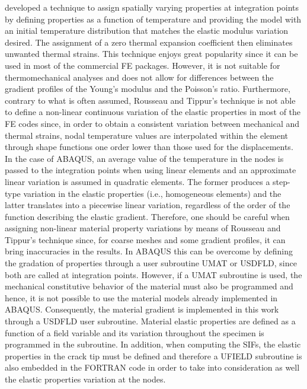 \cite{Rousseau2000} developed a technique to assign spatially varying properties at integration points by defining properties as a function of temperature and providing the model with an initial temperature distribution that matches the elastic modulus variation desired. The assignment of a zero thermal expansion coefficient then eliminates unwanted thermal strains. This technique enjoys great popularity since it can be used in most of the commercial FE packages. However, it is not suitable for thermomechanical analyses and does not allow for differences between the gradient profiles of the Young's modulus and the Poisson's ratio. Furthermore, contrary to what is often assumed, Rousseau and Tippur's technique is not able to define a non-linear continuous variation of the elastic properties in most of the FE codes since, in order to obtain a consistent variation between mechanical and thermal strains, nodal temperature values are interpolated within the element through shape functions one order lower than those used for the displacements. In the case of ABAQUS, an average value of the temperature in the nodes is passed to the integration points when using linear elements and an approximate linear variation is assumed in quadratic elements. The former produces a step-type variation in the elastic properties (i.e., homogeneous elements) and the latter translates into a piecewise linear variation, regardless of the order of the function describing the elastic gradient. Therefore, one should be careful when assigning non-linear material property variations by means of Rousseau and Tippur's technique since, for coarse meshes and some gradient profiles, it can bring inaccuracies in the results. In ABAQUS this can be overcome by defining the gradation of properties through a user subroutine UMAT or USDFLD, since both are called at integration points. However, if a UMAT subroutine is used, the mechanical constitutive behavior of the material must also be programmed and hence, it is not possible to use the material models already implemented in ABAQUS. Consequently, the material gradient is implemented in this work through a USDFLD user subroutine. Material elastic properties are defined as a function of a field variable and its variation throughout the specimen is programmed in the subroutine. In addition, when computing the SIFs, the elastic properties in the crack tip must be defined and therefore a UFIELD subroutine is also embedded in the FORTRAN code in order to take into consideration as well the elastic properties variation at the nodes.

